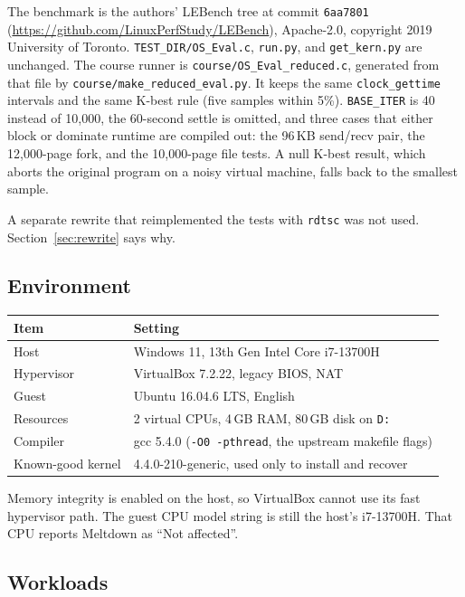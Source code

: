 \documentclass[11pt]{article}
\begin{document}
The benchmark is the authors' LEBench tree at commit \texttt{6aa7801} (\url{https://github.com/LinuxPerfStudy/LEBench}), Apache-2.0, copyright 2019 University of Toronto. \texttt{TEST\_DIR/OS\_Eval.c}, \texttt{run.py}, and \texttt{get\_kern.py} are unchanged. The course runner is \texttt{course/OS\_Eval\_reduced.c}, generated from that file by \texttt{course/make\_reduced\_eval.py}. It keeps the same \texttt{clock\_gettime} intervals and the same K-best rule (five samples within 5\%). \texttt{BASE\_ITER} is 40 instead of 10{,}000, the 60-second settle is omitted, and three cases that either block or dominate runtime are compiled out: the 96\,KB send/recv pair, the 12{,}000-page fork, and the 10{,}000-page file tests. A null K-best result, which aborts the original program on a noisy virtual machine, falls back to the smallest sample.

A separate rewrite that reimplemented the tests with \texttt{rdtsc} was not used. Section~\ref{sec:rewrite} says why.

\subsection{Environment}

\begin{center}
\begin{tabular}{@{}ll@{}}
\toprule
Item & Setting \\
\midrule
Host & Windows 11, 13th Gen Intel Core i7-13700H \\
Hypervisor & VirtualBox 7.2.22, legacy BIOS, NAT \\
Guest & Ubuntu 16.04.6 LTS, English \\
Resources & 2 virtual CPUs, 4\,GB RAM, 80\,GB disk on \texttt{D:} \\
Compiler & gcc 5.4.0 (\texttt{-O0 -pthread}, the upstream makefile flags) \\
Known-good kernel & 4.4.0-210-generic, used only to install and recover \\
\bottomrule
\end{tabular}
\end{center}

Memory integrity is enabled on the host, so VirtualBox cannot use its fast hypervisor path. The guest CPU model string is still the host's i7-13700H. That CPU reports Meltdown as ``Not affected''.

\subsection{Workloads}
\end{document}
